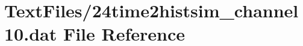 \hypertarget{24time2histsim__channel10_8dat}{}\section{Text\+Files/24time2histsim\+\_\+channel10.dat File Reference}
\label{24time2histsim__channel10_8dat}
